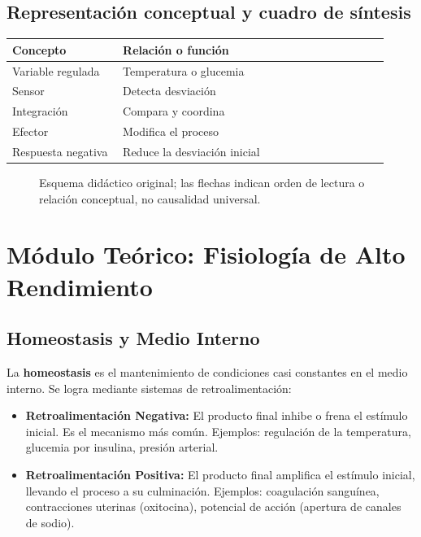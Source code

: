 \subsection{Representación conceptual y cuadro de síntesis}
\begin{longtable}{p{0.27\linewidth}p{0.65\linewidth}}
\toprule Concepto & Relación o función\\\midrule
Variable regulada & Temperatura o glucemia\\
Sensor & Detecta desviación\\
Integración & Compara y coordina\\
Efector & Modifica el proceso\\
Respuesta negativa & Reduce la desviación inicial\\
\bottomrule
\end{longtable}
\begin{figure}[htbp]
\centering
{}
\caption{Esquema didáctico original; las flechas indican orden de lectura o relación conceptual, no causalidad universal.}
\end{figure}

\clearpage



\section{Módulo Teórico: Fisiología de Alto Rendimiento}
\subsection{Homeostasis y Medio Interno}
La \textbf{homeostasis} es el mantenimiento de condiciones casi constantes en el medio interno. Se logra mediante sistemas de retroalimentación:
\begin{itemize}
    \item \textbf{Retroalimentación Negativa:} El producto final inhibe o frena el estímulo inicial. Es el mecanismo más común. Ejemplos: regulación de la temperatura, glucemia por insulina, presión arterial.
    \item \textbf{Retroalimentación Positiva:} El producto final amplifica el estímulo inicial, llevando el proceso a su culminación. Ejemplos: coagulación sanguínea, contracciones uterinas (oxitocina), potencial de acción (apertura de canales de sodio).
\end{itemize}

